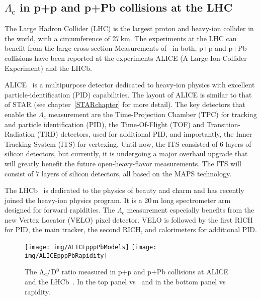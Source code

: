 \subsection{$\Lambda_\mathrm{c}$ in p+p and p+Pb collisions at the LHC\label{LcInPPandPPb}}
The Large Hadron Collider (LHC) is the largest proton and heavy-ion collider in the world, with a circumference of 27$\,$km. The experiments at the LHC can benefit from the large cross-section  Measurements of \Lambdac\ in both, p+p and p+Pb collisions have been reported at  the experiments ALICE (A Large-Ion-Collider Experiment) and the LHCb. 

ALICE~\cite{ALICE} is a multipurpose detector dedicated to heavy-ion physics with excellent particle-identification (PID) capabilities. The layout of ALICE is similar to that of STAR (see chapter~\ref{STARchapter} for more detail). The key detectors that enable the $\Lambda_\mathrm{c}$ measurement are the Time-Projection Chamber (TPC) for tracking and particle identification (PID), the Time-Of-Flight (TOF) and Transition-Radiation (TRD) detectors, used for additional PID, and importantly, the Inner Tracking System (ITS) for vertexing. Until now, the ITS consisted of 6 layers of silicon detectors, but currently, it is undergoing a major overhaul upgrade that will greatly benefit the future open-heavy-flavor measurements. The ITS will consist of 7 layers of silicon detectors, all based on the MAPS technology.

The LHCb~\cite{LHCb} is dedicated to the physics of beauty and charm and has recently joined the heavy-ion physics program. It is a 20$\,$m long spectrometer arm designed for forward rapidities. The $\Lambda_\mathrm{c}$ measurement especially benefits from the new Vertex Locator (VELO) \cite{VELO} pixel detector. VELO is followed by the first RICH for PID, the main tracker, the second RICH, and calorimeters for additional PID.

\begin{figure}[!htb]
\centering
\texttt{[image: img/ALICEpppPbModels]}
\texttt{[image: img/ALICEpppPbRapidity]}
\caption[The $\Lambdac/$D$^0$ ratio measured in p+p and p+Pb collisions at ALICE\@.]{The $\Lambdac/$D$^0$ ratio measured in p+p and p+Pb collisions at ALICE~\cite{AliceLcPPPPb} and the LHCb~\cite{LHCbPrompt, LHCbPrivate}. In the top panel vs \pt\ and in the bottom panel vs rapidity.}
\label{fig:pppPb}
\end{figure}

